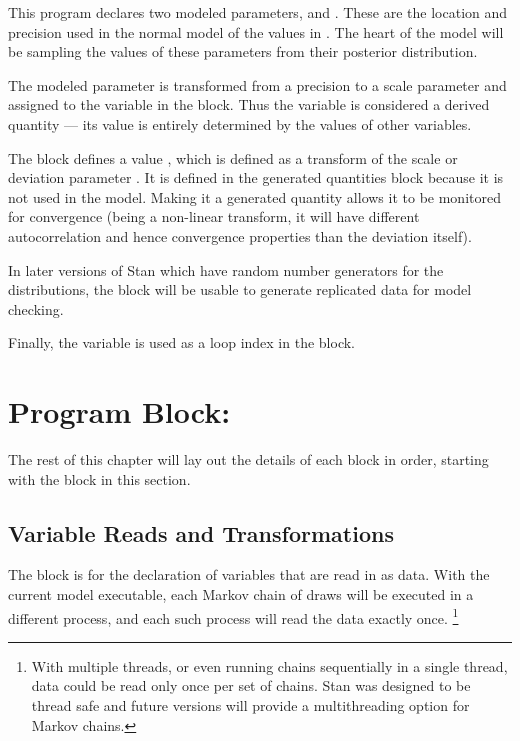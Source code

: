 This program declares two modeled parameters,  and
.  These are the location and precision used in the normal
model of the values in .  The heart of the model will be
sampling the values of these parameters from their posterior
distribution.

The modeled parameter  is transformed from a precision to
a scale parameter and assigned to the variable  in the
 block. Thus the variable 
is considered a derived quantity --- its value is entirely determined
by the values of other variables.

The  block defines a value
, which is defined as a transform of the scale or
deviation parameter .  It is defined in the generated
quantities block because it is not used in the model.  Making it
a generated quantity allows it to be monitored for convergence (being
a non-linear transform, it will have different autocorrelation and
hence convergence properties than the deviation itself).

In later versions of Stan which have random number generators for
the distributions, the  block will be
usable to generate replicated data for model checking.

Finally, the variable  is used as a loop index in the
 block.


\section{Program Block: }

The rest of this chapter will lay out the details of each block in
order, starting with the  block in this section.

\subsection{Variable Reads and Transformations}

The  block is for the declaration of variables that are
read in as data.  With the current model executable, each Markov chain
of draws will be executed in a different process, and each such
process will read the data exactly once.%
%
\footnote{With multiple threads, or even running chains sequentially
  in a single thread, data could be read only once per set of
  chains. Stan was designed to be thread safe and future versions
  will provide a multithreading option for Markov chains.\label{thread.footnote}}
%

